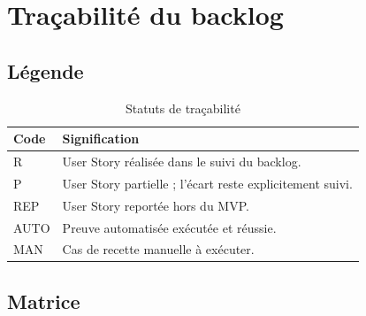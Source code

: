 \chapter{Traçabilité du backlog}

\section{Légende}

\begin{table}[H]
\centering
\caption{Statuts de traçabilité}
\begin{tabularx}{\textwidth}{|C{2cm}|Y|}
\hline
{}\textbf{Code} & \textbf{Signification} \\ \hline
R & User Story réalisée dans le suivi du backlog. \\ \hline
P & User Story partielle ; l'écart reste explicitement suivi. \\ \hline
REP & User Story reportée hors du MVP. \\ \hline
AUTO & Preuve automatisée exécutée et réussie. \\ \hline
MAN & Cas de recette manuelle à exécuter. \\ \hline
\end{tabularx}
\end{table}

\section{Matrice}

